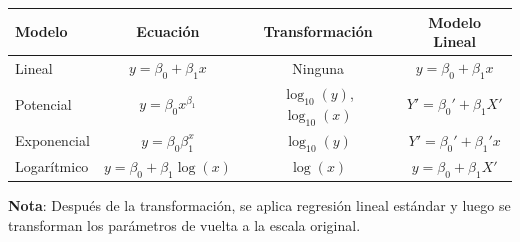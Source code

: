 \documentclass[10pt,a4paper]{article}
\begin{document}
\begin{tcolorbox}[title=Resumen de Transformaciones]
    \begin{center}
    \begin{tabular}{|l|c|c|c|}
    \hline
    \textbf{Modelo} & \textbf{Ecuación} & \textbf{Transformación} & \textbf{Modelo Lineal} \\
    \hline
    Lineal & $y = \beta_0 + \beta_1 x$ & Ninguna & $y = \beta_0 + \beta_1 x$ \\
    \hline
    Potencial & $y = \beta_0 x^{\beta_1}$ & $\log_{10}(y)$, $\log_{10}(x)$ & $Y' = \beta_0' + \beta_1 X'$ \\
    \hline
    Exponencial & $y = \beta_0 \beta_1^x$ & $\log_{10}(y)$ & $Y' = \beta_0' + \beta_1' x$ \\
    \hline
    Logarítmico & $y = \beta_0 + \beta_1 \log(x)$ & $\log(x)$ & $y = \beta_0 + \beta_1 X'$ \\
    \hline
    \end{tabular}
    \end{center}
    
    \textbf{Nota}: Después de la transformación, se aplica regresión lineal estándar y luego se transforman los parámetros de vuelta a la escala original.
\end{tcolorbox}

\end{document}
